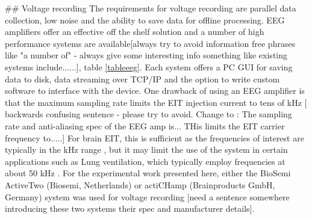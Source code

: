 ## Voltage recording
The requirements for voltage recording are parallel data collection, low noise and the ability to save data for offline processing. EEG amplifiers offer an effective off the shelf solution and a number of high performance systems are available[always try to avoid information free phrases like "a number of" - always give some interesting info something like existing systems include......], table \ref{tableeeg}. Each system offers a PC GUI for saving data to disk, data streaming over TCP/IP and the option to write custom software to interface with the device. One drawback of using an EEG amplifier is that the maximum sampling rate limits the EIT injection current to tens of kHz [ backwards confusing sentence - please try to avoid. Change to : The sampling rate and anti-aliasing spec of the EEG amp is... THis limits the EIT carrier frequency to.....] For brain EIT, this is sufficient as the frequencies of interest are typically in the kHz range \cite{Aristovich_2015}, but it may limit the use of the system in certain applications such as Lung ventilation, which typically employ frequencies at about 50 kHz \cite{Frerichs_2000}. For the experimental work presented here, either the BioSemi ActiveTwo (Biosemi, Netherlands) or actiCHamp (Brainproducts GmbH, Germany) system was used for voltage recording [need a sentence somewhere introducing these two systems their spec and manufacturer details].





